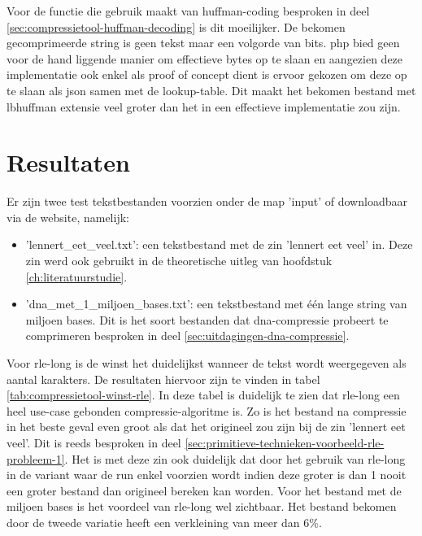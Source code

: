Voor de functie die gebruik maakt van \gls{huffman-coding} besproken in deel \ref{sec:compressietool-huffman-decoding} is dit moeilijker. De bekomen gecomprimeerde \gls{string} is geen tekst maar een volgorde van \glspl{bit}. \Gls{php} bied geen voor de hand liggende manier om effectieve bytes op te slaan en aangezien deze implementatie ook enkel als proof of concept dient is ervoor gekozen om deze op te slaan als \gls{json} samen met de \gls{lookup-table}. Dit maakt het bekomen bestand met \gls{lbhuffman} extensie veel groter dan het in een effectieve implementatie zou zijn.

\section{Resultaten}
\label{sec:compressietool-resultaten}

Er zijn twee test tekstbestanden voorzien onder de map 'input' of downloadbaar via de website, namelijk:

\begin{itemize}
	\item 'lennert\_eet\_veel.txt': een tekstbestand met de zin 'lennert eet veel' in. Deze zin werd ook gebruikt in de theoretische uitleg van hoofdstuk \ref{ch:literatuurstudie}.
	
	\item 'dna\_met\_1\_miljoen\_bases.txt': een tekstbestand met één lange \gls{string} van miljoen bases. Dit is het soort bestanden dat \gls{dna-compressie} probeert te comprimeren besproken in deel \ref{sec:uitdagingen-dna-compressie}.
\end{itemize}

Voor \gls{rle-long} is de winst het duidelijkst wanneer de tekst wordt weergegeven als aantal karakters. De resultaten hiervoor zijn te vinden in tabel \ref{tab:compressietool-winst-rle}. In deze tabel is duidelijk te zien dat \gls{rle-long} een heel \gls{use-case} gebonden \gls{compressie-algoritme} is. Zo is het bestand na compressie in het beste geval even groot als dat het origineel zou zijn bij de zin 'lennert eet veel'. Dit is reeds besproken in deel \ref{sec:primitieve-technieken-voorbeeld-rle-probleem-1}. Het is met deze zin ook duidelijk dat door het gebruik van \gls{rle-long} in de variant waar de run enkel voorzien wordt indien deze groter is dan 1 nooit een groter bestand dan origineel bereken kan worden. Voor het bestand met de miljoen bases is het voordeel van \gls{rle-long} wel zichtbaar. Het bestand bekomen door de tweede variatie heeft een verkleining van meer dan 6\%.

